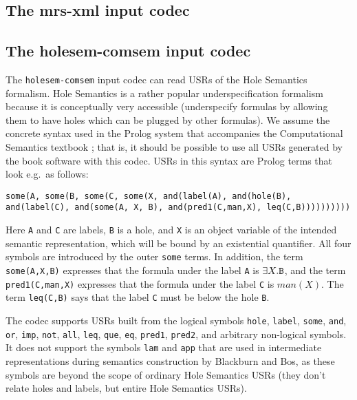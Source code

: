 \subsection{The mrs-xml input codec}




\subsection{The holesem-comsem input codec}

The \verb?holesem-comsem? input codec can read USRs of the Hole
Semantics formalism. Hole Semantics \cite{Bos96} is a rather popular
underspecification formalism because it is conceptually very
accessible (underspecify formulas by allowing them to have holes which
can be plugged by other formulas). We assume the concrete syntax used
in the Prolog system that accompanies the Computational Semantics
textbook \cite{blackburn05:_repres_infer_natur_languag}; that is, it
should be possible to use all USRs generated by the book software with
this codec. USRs in this syntax are Prolog terms that look e.g.\ as
follows:

\begin{verbatim}
some(A, some(B, some(C, some(X, and(label(A), and(hole(B),
and(label(C), and(some(A, X, B), and(pred1(C,man,X), leq(C,B))))))))))
\end{verbatim}

Here \verb?A? and \verb?C? are labels, \verb?B? is a hole, and
\verb?X? is an object variable of the intended semantic
representation, which will be bound by an existential quantifier. All
four symbols are introduced by the outer \verb?some? terms. In
addition, the term \verb?some(A,X,B)? expresses that the formula under
the label \verb?A? is $\exists X. \verb?B?$, and the term
\verb?pred1(C,man,X)? expresses that the formula under the label
\verb?C? is $man(X)$. The term \verb?leq(C,B)? says that the label
\verb?C? must be below the hole \verb?B?.

The codec supports USRs built from the logical symbols \verb?hole?,
\verb?label?, \verb?some?, \verb?and?, \verb?or?, \verb?imp?,
\verb?not?, \verb?all?, \verb?leq?, \verb?que?, \verb?eq?,
\verb?pred1?, \verb?pred2?, and arbitrary non-logical symbols. It does
not support the symbols \verb?lam? and \verb?app? that are used in
intermediate representations during semantics construction by
Blackburn and Bos, as these symbols are beyond the scope of ordinary
Hole Semantics USRs (they don't relate holes and labels, but entire
Hole Semantics USRs).

